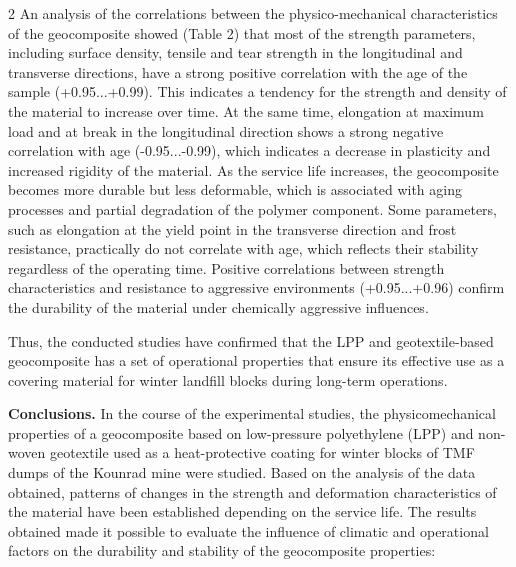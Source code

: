 \begin{multicols}{2}
An analysis of the correlations between the physico-mechanical
characteristics of the geocomposite showed (Table 2) that most of the
strength parameters, including surface density, tensile and tear
strength in the longitudinal and transverse directions, have a strong
positive correlation with the age of the sample (+0.95...+0.99). This
indicates a tendency for the strength and density of the material to
increase over time. At the same time, elongation at maximum load and at
break in the longitudinal direction shows a strong negative correlation
with age (-0.95...-0.99), which indicates a decrease in plasticity and
increased rigidity of the material. As the service life increases, the
geocomposite becomes more durable but less deformable, which is
associated with aging processes and partial degradation of the polymer
component. Some parameters, such as elongation at the yield point in the
transverse direction and frost resistance, practically do not correlate
with age, which reflects their stability regardless of the operating
time. Positive correlations between strength characteristics and
resistance to aggressive environments (+0.95...+0.96) confirm the
durability of the material under chemically aggressive influences.

Thus, the conducted studies have confirmed that the LPP and
geotextile-based geocomposite has a set of operational properties that
ensure its effective use as a covering material for winter landfill
blocks during long-term operations.

{\bfseries Conclusions.} In the course of the experimental studies, the
physicomechanical properties of a geocomposite based on low-pressure
polyethylene (LPP) and non-woven geotextile used as a heat-protective
coating for winter blocks of TMF dumps of the Kounrad mine were studied.
Based on the analysis of the data obtained, patterns of changes in the
strength and deformation characteristics of the material have been
established depending on the service life. The results obtained made it
possible to evaluate the influence of climatic and operational factors
on the durability and stability of the geocomposite properties:
\end{multicols}

